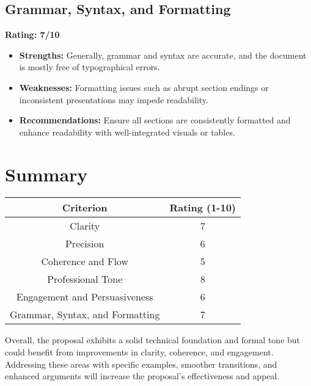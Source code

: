 \documentclass{article}
\begin{document}
\subsection{Grammar, Syntax, and Formatting}
\textbf{Rating: 7/10}

\begin{itemize}
    \item \textbf{Strengths:} Generally, grammar and syntax are accurate, and the document is mostly free of typographical errors.
    \item \textbf{Weaknesses:} Formatting issues such as abrupt section endings or inconsistent presentations may impede readability.
    \item \textbf{Recommendations:} Ensure all sections are consistently formatted and enhance readability with well-integrated visuals or tables.
\end{itemize}

\section{Summary}

\begin{center}
\begin{tabular}{|c|c|}
\hline
\textbf{Criterion} & \textbf{Rating (1-10)} \\
\hline
Clarity & 7 \\
Precision & 6 \\
Coherence and Flow & 5 \\
Professional Tone & 8 \\
Engagement and Persuasiveness & 6 \\
Grammar, Syntax, and Formatting & 7 \\
\hline
\end{tabular}
\end{center}

Overall, the proposal exhibits a solid technical foundation and formal tone but could benefit from improvements in clarity, coherence, and engagement. Addressing these areas with specific examples, smoother transitions, and enhanced arguments will increase the proposal's effectiveness and appeal.
\end{document}

